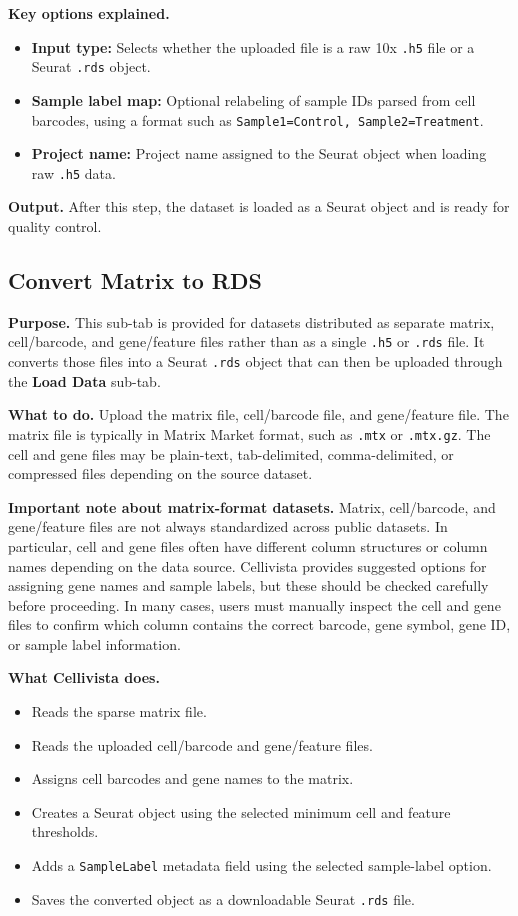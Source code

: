 \documentclass[11pt]{article}
\begin{document}
\textbf{Key options explained.}
\begin{itemize}
  \item \textbf{Input type:} Selects whether the uploaded file is a raw 10x \texttt{.h5} file or a Seurat \texttt{.rds} object.
  \item \textbf{Sample label map:} Optional relabeling of sample IDs parsed from cell barcodes, using a format such as \texttt{Sample1=Control, Sample2=Treatment}.
  \item \textbf{Project name:} Project name assigned to the Seurat object when loading raw \texttt{.h5} data.
\end{itemize}

\textbf{Output.}
After this step, the dataset is loaded as a Seurat object and is ready for quality control.

\subsection*{Convert Matrix to RDS}

\textbf{Purpose.}
This sub-tab is provided for datasets distributed as separate matrix, cell/barcode, and gene/feature files rather than as a single \texttt{.h5} or \texttt{.rds} file. It converts those files into a Seurat \texttt{.rds} object that can then be uploaded through the \textbf{Load Data} sub-tab.

\textbf{What to do.}
Upload the matrix file, cell/barcode file, and gene/feature file. The matrix file is typically in Matrix Market format, such as \texttt{.mtx} or \texttt{.mtx.gz}. The cell and gene files may be plain-text, tab-delimited, comma-delimited, or compressed files depending on the source dataset.

\textbf{Important note about matrix-format datasets.}
Matrix, cell/barcode, and gene/feature files are not always standardized across public datasets. In particular, cell and gene files often have different column structures or column names depending on the data source. Cellivista provides suggested options for assigning gene names and sample labels, but these should be checked carefully before proceeding. In many cases, users must manually inspect the cell and gene files to confirm which column contains the correct barcode, gene symbol, gene ID, or sample label information.

\textbf{What Cellivista does.}
\begin{itemize}
  \item Reads the sparse matrix file.
  \item Reads the uploaded cell/barcode and gene/feature files.
  \item Assigns cell barcodes and gene names to the matrix.
  \item Creates a Seurat object using the selected minimum cell and feature thresholds.
  \item Adds a \texttt{SampleLabel} metadata field using the selected sample-label option.
  \item Saves the converted object as a downloadable Seurat \texttt{.rds} file.
\end{itemize}
\end{document}
